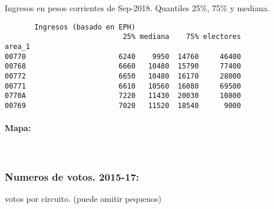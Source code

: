 \documentclass[11pt]{article}
\begin{document}
    
    Ingresos en pesos corrientes de Sep-2018. Quantiles 25\%, 75\% y
mediana.

    
    
    \begin{verbatim}
       Ingresos (basado en EPH)                         
                            25% mediana    75% electores
area_1                                                  
00770                      6240    9950  14760     46400
00768                      6660   10480  15790     77400
00772                      6650   10480  16170     28000
00771                      6610   10560  16080     69500
0770A                      7220   11430  20030     10800
00769                      7020   11520  18540      9000
    \end{verbatim}

    
    \hypertarget{mapa}{%
\paragraph{Mapa:}\label{mapa}}

    
    \begin{center}
    \end{center}
    { \hspace*{\fill} \\}
    
    \hypertarget{numeros-de-votos.-2015-17}{%
\subsubsection{Numeros de votos.
2015-17:}\label{numeros-de-votos.-2015-17}}

    
    votos por circuito. (puede omitir pequenos)

    
    
\end{document}

